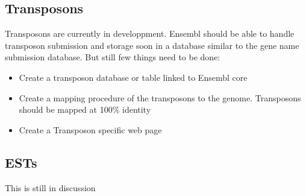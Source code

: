 \documentclass[a4paper,10pt]{article}
\begin{document}
\subsection{Transposons}
Transposons are currently in developpment. Ensembl should be able to handle transposon submission and storage soon in a database similar to the gene name submission database.
But still few things need to be done:
\begin{itemize}
\item{Create a transposon database or table linked to Ensembl core}
\item{Create a mapping procedure of the transposons to the genome. Transposons should be mapped at 100\% identity}
\item{Create a Transposon specific web page}
\end{itemize}

\subsection{ESTs}
This is still in discussion
\end{document}

